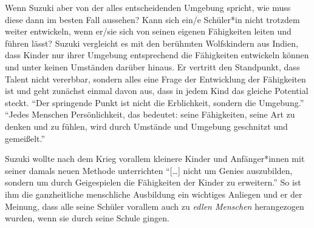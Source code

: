 Wenn Suzuki aber von der alles entscheidenden Umgebung spricht, wie muss diese
dann im besten Fall aussehen? Kann sich ein/e Schüler*in nicht trotzdem weiter
entwickeln, wenn er/sie sich von seinen eigenen Fähigkeiten leiten und führen
lässt? Suzuki vergleicht es mit den berühmten Wolfskindern aus Indien, dass
Kinder nur ihrer Umgebung entsprechend die Fähigkeiten entwickeln können und
unter keinen Umständen darüber hinaus. \autocite[24]{suzuki:erziehung_ist_liebe}
Er vertritt den Standpunkt, dass Talent nicht vererbbar, sondern alles eine Frage
der Entwicklung der Fähigkeiten ist und geht zunächst einmal davon aus, dass in
jedem Kind das gleiche Potential steckt. \enquote{Der springende Punkt ist nicht
die Erblichkeit, sondern die Umgebung.}
\autocite[24]{suzuki:erziehung_ist_liebe} \enquote{Jedes Menschen
Persönlichkeit, das bedeutet: seine Fähigkeiten, seine Art zu denken und zu
fühlen, wird durch Umstände und Umgebung geschnitzt und gemeißelt.}
\autocite[20]{suzuki:erziehung_ist_liebe}

Suzuki wollte nach dem Krieg vorallem kleinere Kinder und Anfänger*innen mit
seiner damals neuen Methode unterrichten \enquote{[…] nicht um Genies
auszubilden, sondern um durch Geigespielen die Fähigkeiten der Kinder zu
erweitern.} \autocite[43]{suzuki:erziehung_ist_liebe} So ist ihm die
ganzheitliche menschliche Ausbildung ein wichtiges Anliegen und er der Meinung,
dass alle seine Schüler vorallem auch zu \emph{edlen Menschen} herangezogen
wurden, wenn sie durch seine Schule gingen. 










